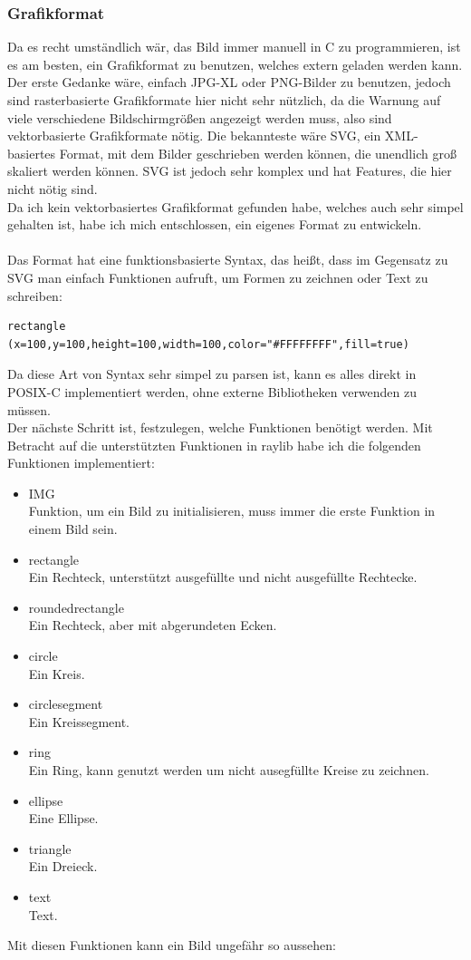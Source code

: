 \subsubsection{Grafikformat}
Da es recht umständlich wär, das Bild immer manuell in C zu programmieren, ist es am besten, ein Grafikformat zu benutzen, welches extern geladen werden kann. Der erste Gedanke wäre, einfach JPG-XL oder PNG-Bilder zu benutzen, jedoch sind rasterbasierte Grafikformate hier nicht sehr nützlich, da die Warnung auf viele verschiedene Bildschirmgrößen angezeigt werden muss, also sind vektorbasierte Grafikformate nötig. Die bekannteste wäre SVG, ein XML-basiertes Format, mit dem Bilder geschrieben werden können, die unendlich groß skaliert werden können. SVG ist jedoch sehr komplex und hat Features, die hier nicht nötig sind.\\
Da ich kein vektorbasiertes Grafikformat gefunden habe, welches auch sehr simpel gehalten ist, habe ich mich entschlossen, ein eigenes Format zu entwickeln.\\
\\
Das Format hat eine funktionsbasierte Syntax, das heißt, dass im Gegensatz zu SVG man einfach Funktionen aufruft, um Formen zu zeichnen oder Text zu schreiben:
\begin{verbatim}
rectangle (x=100,y=100,height=100,width=100,color="#FFFFFFFF",fill=true)
\end{verbatim}
Da diese Art von Syntax sehr simpel zu parsen ist, kann es alles direkt in POSIX-C implementiert werden, ohne externe Bibliotheken verwenden zu müssen.\\
Der nächste Schritt ist, festzulegen, welche Funktionen benötigt werden. Mit Betracht auf die unterstützten Funktionen in raylib habe ich die folgenden Funktionen implementiert:
\begin{itemize}
\item IMG\\
  Funktion, um ein Bild zu initialisieren, muss immer die erste Funktion in einem Bild sein.
\item rectangle\\
  Ein Rechteck, unterstützt ausgefüllte und nicht ausgefüllte Rechtecke.
\item roundedrectangle\\
  Ein Rechteck, aber mit abgerundeten Ecken.
\item circle\\
  Ein Kreis.
\item circlesegment\\
  Ein Kreissegment.
\item ring\\
  Ein Ring, kann genutzt werden um nicht ausegfüllte Kreise zu zeichnen.
\item ellipse\\
  Eine Ellipse.
\item triangle\\
  Ein Dreieck.
\item text\\
  Text.
\end{itemize}
Mit diesen Funktionen kann ein Bild ungefähr so aussehen:\\

